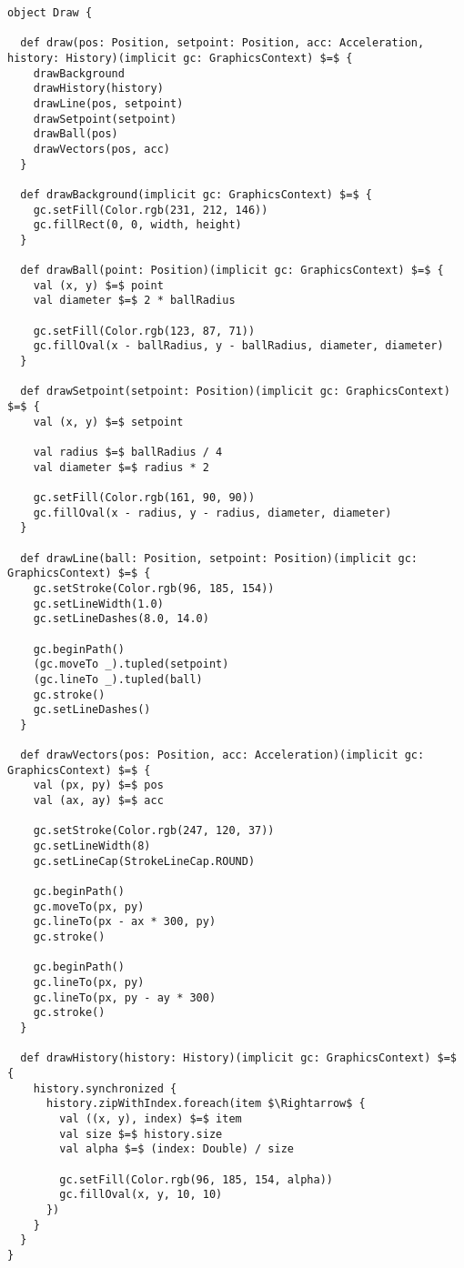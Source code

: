 \begin{lstlisting}[style=ScalaStyle, caption={Ball movement \code{Draw} object}, label={lst:ball-full-draw}]
object Draw {

  def draw(pos: Position, setpoint: Position, acc: Acceleration, history: History)(implicit gc: GraphicsContext) $=$ {
    drawBackground
    drawHistory(history)
    drawLine(pos, setpoint)
    drawSetpoint(setpoint)
    drawBall(pos)
    drawVectors(pos, acc)
  }

  def drawBackground(implicit gc: GraphicsContext) $=$ {
    gc.setFill(Color.rgb(231, 212, 146))
    gc.fillRect(0, 0, width, height)
  }

  def drawBall(point: Position)(implicit gc: GraphicsContext) $=$ {
    val (x, y) $=$ point
    val diameter $=$ 2 * ballRadius

    gc.setFill(Color.rgb(123, 87, 71))
    gc.fillOval(x - ballRadius, y - ballRadius, diameter, diameter)
  }

  def drawSetpoint(setpoint: Position)(implicit gc: GraphicsContext) $=$ {
    val (x, y) $=$ setpoint

    val radius $=$ ballRadius / 4
    val diameter $=$ radius * 2

    gc.setFill(Color.rgb(161, 90, 90))
    gc.fillOval(x - radius, y - radius, diameter, diameter)
  }

  def drawLine(ball: Position, setpoint: Position)(implicit gc: GraphicsContext) $=$ {
    gc.setStroke(Color.rgb(96, 185, 154))
    gc.setLineWidth(1.0)
    gc.setLineDashes(8.0, 14.0)

    gc.beginPath()
    (gc.moveTo _).tupled(setpoint)
    (gc.lineTo _).tupled(ball)
    gc.stroke()
    gc.setLineDashes()
  }

  def drawVectors(pos: Position, acc: Acceleration)(implicit gc: GraphicsContext) $=$ {
    val (px, py) $=$ pos
    val (ax, ay) $=$ acc

    gc.setStroke(Color.rgb(247, 120, 37))
    gc.setLineWidth(8)
    gc.setLineCap(StrokeLineCap.ROUND)

    gc.beginPath()
    gc.moveTo(px, py)
    gc.lineTo(px - ax * 300, py)
    gc.stroke()

    gc.beginPath()
    gc.lineTo(px, py)
    gc.lineTo(px, py - ay * 300)
    gc.stroke()
  }

  def drawHistory(history: History)(implicit gc: GraphicsContext) $=$ {
    history.synchronized {
      history.zipWithIndex.foreach(item $\Rightarrow$ {
        val ((x, y), index) $=$ item
        val size $=$ history.size
        val alpha $=$ (index: Double) / size

        gc.setFill(Color.rgb(96, 185, 154, alpha))
        gc.fillOval(x, y, 10, 10)
      })
    }
  }
}
\end{lstlisting}

